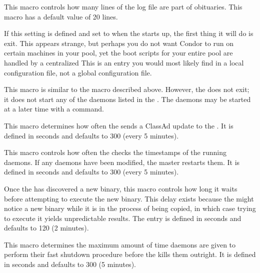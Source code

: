 \begin{description}
\label{param:ObituaryLogLength}
\item[\Macro{OBITUARY\_LOG\_LENGTH}]
  This macro controls how many lines
  of the log file are part of obituaries.  This macro has a default
  value of 20 lines.

\label{param:StartMaster}
\item[\Macro{START\_MASTER}]
  If this setting is defined and set to 
  when the  starts up, the first
  thing it will do is exit.  This appears strange, but perhaps you
  do not want Condor to run on certain machines in your pool, yet
  the boot scripts for your entire pool are handled by a centralized
  This is
  an entry you would most likely find in a local configuration file,
  not a global configuration file.

\label{param:StartDaemons}
\item[\Macro{START\_DAEMONS}]
  This macro
  is similar to the  macro described above.
  However, the  does not exit; it does not start any
  of the daemons listed in the .
  The daemons may be started at a later time with a 
  command.

\label{param:MasterUpdateInterval}
\item[\Macro{MASTER\_UPDATE\_INTERVAL}]
  This macro determines how often
  the  sends a ClassAd update to the
  .  It is defined in seconds and defaults to 300
  (every 5 minutes).
  
\label{param:MasterCheckNewExecInterval}
\item[\Macro{MASTER\_CHECK\_NEW\_EXEC\_INTERVAL}]
  This macro controls how often the  checks the timestamps
  of the running daemons.  If any daemons have been modified, the
  master restarts them.  It is defined in seconds and defaults to 300
  (every 5 minutes).

\label{param:MasterNewBinaryDelay}
\item[\Macro{MASTER\_NEW\_BINARY\_DELAY}]
  Once the  has
  discovered a new binary, this macro controls how long it waits
  before attempting to execute the new binary.  This delay exists
  because the  might notice a new binary while it
  is in the process of being copied,
  in which case trying to execute it yields
  unpredictable results.  The entry is defined in seconds and
  defaults to 120 (2 minutes).

\label{param:ShutdownFastTimeout}
\item[\Macro{SHUTDOWN\_FAST\_TIMEOUT}]
  This macro determines the maximum
  amount of time daemons are given to perform their
  fast shutdown procedure before the  kills them
  outright.  It is defined in seconds and defaults to 300 (5 minutes).


\end{description}
